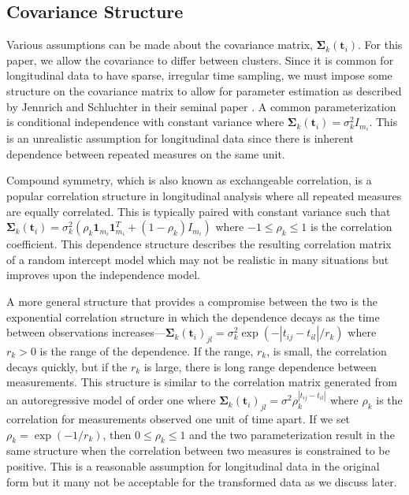 \documentclass[12pt]{article}
\newcommand{\B}[0]{\mathbf}
\begin{document}
\subsection{Covariance Structure}
Various assumptions can be made about the covariance matrix, $\B \Sigma_{k}(\B t_{i})$. For this paper, we allow the covariance to differ between clusters. Since it is common for longitudinal data to have sparse, irregular time sampling, we must impose some structure on the covariance matrix to allow for parameter estimation as described by Jennrich and Schluchter in their seminal paper \cite{jennrich1986}. A common parameterization is conditional independence with constant variance where $\B \Sigma_{k}(\B t_{i}) = \sigma_{k}^{2}I_{m_{i}}$. This is an unrealistic assumption for longitudinal data since there is inherent dependence between repeated measures on the same unit. 

Compound symmetry, which is also known as exchangeable correlation, is a popular correlation structure in longitudinal analysis where all repeated measures are equally correlated. This is typically paired with constant variance such that $\B \Sigma_{k}(\B t_{i}) = \sigma_{k}^{2}(\rho_{k}\B1_{m_{i}}\B1_{m_{i}}^{T}+(1-\rho_{k})I_{m_{i}})$ where $-1\leq\rho_{k}\leq 1$ is the correlation coefficient. This dependence structure describes the resulting correlation matrix of a random intercept model which may not be realistic in many situations but improves upon the independence model. 

A more general structure that provides a compromise between the two is the exponential correlation structure in which the dependence decays as the time between observations increases---$\B \Sigma_{k}(\B t_{i})_{jl} = \sigma_{k}^{2}\exp(-| t_{ij}-t_{il}| / r_{k})$ where $r_{k}> 0$ is the range of the dependence. If the range, $r_{k}$, is small, the correlation decays quickly, but if the $r_{k}$ is large, there is long range dependence between measurements. This structure is similar to the correlation matrix generated from an autoregressive model of order one where $\B\Sigma_{k}(\B t_{i})_{jl} = \sigma^{2}\rho_{k}^{|t_{ij}-t_{il}|}$ where $\rho_{k}$ is the correlation for measurements observed one unit of time apart. If we set $\rho_{k} = \exp(-1/r_{k})$, then $0\leq\rho_{k}\leq1$ and the two parameterization result in the same structure when the correlation between two measures is constrained to be positive. This is a reasonable assumption for longitudinal data in the original form but it many not be acceptable for the transformed data as we discuss later.
\end{document}
